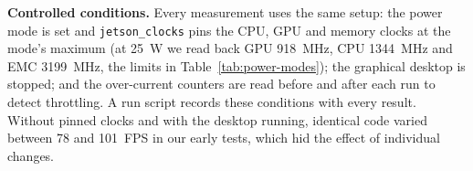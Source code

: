 \textbf{Controlled conditions.} Every measurement uses the same setup: the
power mode is set and \texttt{jetson\_clocks} pins the CPU, GPU and memory
clocks at the mode's maximum (at 25~W we read back GPU 918~MHz, CPU
1344~MHz and EMC 3199~MHz, the limits in Table~\ref{tab:power-modes}); the graphical desktop is stopped; and the
over-current counters are read before and after each run to detect
throttling. A run script records these conditions with every result. Without
pinned clocks and with the desktop running, identical code varied between 78
and 101~FPS in our early tests, which hid the effect of individual changes.
